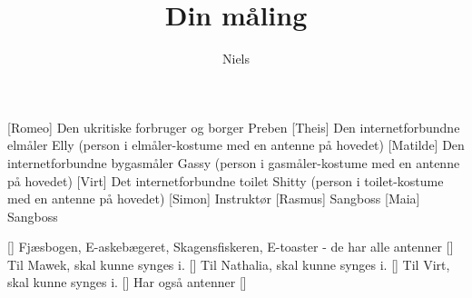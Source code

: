 \documentclass[a4paper,11pt]{article}
\title{Din måling}
\author{Niels}
\begin{document}
\maketitle

\begin{roles}
[Romeo] Den ukritiske forbruger og borger Preben
[Theis] Den internetforbundne elmåler Elly (person i elmåler-kostume med en antenne på hovedet)
[Matilde] Den internetforbundne bygasmåler Gassy (person i gasmåler-kostume med en antenne på hovedet)
[Virt] Det internetforbundne toilet Shitty (person i toilet-kostume med en antenne på hovedet)
[Simon] Instruktør
[Rasmus] Sangboss
[Maia] Sangboss
\end{roles}

\begin{props}
  [] Fjæsbogen, E-askebægeret, Skagensfiskeren, E-toaster - de har alle antenner
  [] Til Mawek, skal kunne synges i.
  [] Til Nathalia, skal kunne synges i.
  [] Til Virt, skal kunne synges i.
  [] Har også antenner
  []
\end{props}
\end{document}
